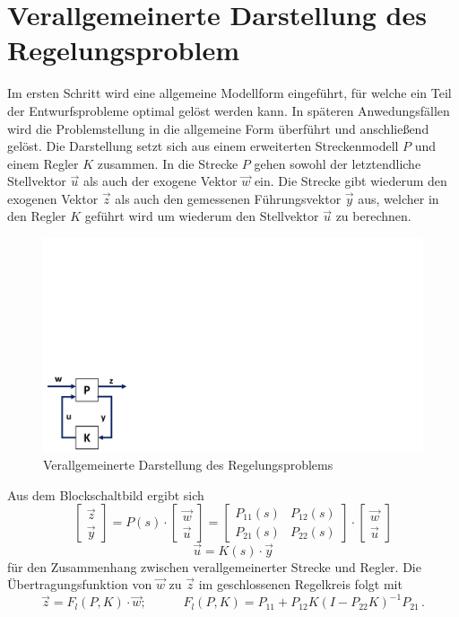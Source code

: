 \section{Verallgemeinerte Darstellung des Regelungsproblem}
Im ersten Schritt wird eine allgemeine Modellform eingeführt, für welche ein Teil der Entwurfsprobleme optimal gelöst werden kann. In späteren Anwedungsfällen wird die Problemstellung in die allgemeine Form überführt und anschließend gelöst. Die Darstellung setzt sich aus einem erweiterten Streckenmodell $P$ und einem Regler $K$ zusammen. In die Strecke $P$ gehen sowohl der letztendliche Stellvektor $\vec{u}$ als auch der exogene Vektor $\vec{w}$ ein. Die Strecke gibt wiederum den exogenen Vektor $\vec{z}$ als auch den gemessenen Führungsvektor $\vec{y}$ aus, welcher in den Regler $K$ geführt wird um wiederum den Stellvektor $\vec{u}$ zu berechnen.

\begin{figure}[h!]
\centering
\includegraphics[trim={0 0 25cm 12cm}, clip, width=0.3\linewidth]{img/StandardControlProblem_BSB}
\caption{Verallgemeinerte Darstellung des Regelungsproblems}
\end{figure}

Aus dem Blockschaltbild ergibt sich 
\begin{equation}
\begin{bmatrix}
\vec{z} \\ \vec{y}
\end{bmatrix} = P(s)\cdot \begin{bmatrix}
\vec{w} \\ \vec{u}\end{bmatrix} = \begin{bmatrix}
P_{11}(s) & P_{12}(s) \\ P_{21}(s) & P_{22}(s)
\end{bmatrix}\cdot \begin{bmatrix}
\vec{w} \\ \vec{u}
\end{bmatrix}
\end{equation}
\begin{equation}
\vec{u} = K(s)\cdot \vec{y}
\end{equation}
für den Zusammenhang zwischen verallgemeinerter Strecke und Regler. Die Übertragungsfunktion von $\vec{w}$ zu $\vec{z}$ im geschlossenen Regelkreis folgt mit
\begin{equation}
\vec{z} = F_l(P,K)\cdot \vec{w}; \hspace{35pt} F_l(P,K) = P_{11} + P_{12}K(I - P_{22}K)^{-1}P_{21}\,.
\end{equation}
